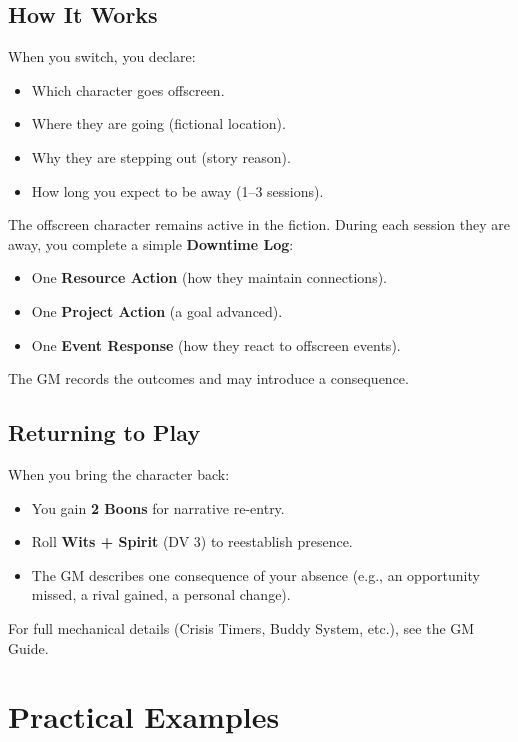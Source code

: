 \subsection{How It Works}
When you switch, you declare:
\begin{itemize}
    \item Which character goes offscreen.
    \item Where they are going (fictional location).
    \item Why they are stepping out (story reason).
    \item How long you expect to be away (1--3 sessions).
\end{itemize}
The offscreen character remains active in the fiction. During each session they are away, you complete a simple \textbf{Downtime Log}:
\begin{itemize}
    \item One \textbf{Resource Action} (how they maintain connections).
    \item One \textbf{Project Action} (a goal advanced).
    \item One \textbf{Event Response} (how they react to offscreen events).
\end{itemize}
The GM records the outcomes and may introduce a consequence.

\subsection{Returning to Play}
When you bring the character back:
\begin{itemize}
    \item You gain \textbf{2 Boons} for narrative re-entry.
    \item Roll \textbf{Wits + Spirit} (DV 3) to reestablish presence.
    \item The GM describes one consequence of your absence (e.g., an opportunity missed, a rival gained, a personal change).
\end{itemize}

For full mechanical details (Crisis Timers, Buddy System, etc.), see the GM Guide.

\section{Practical Examples}
\label{sec:asset-follower-examples}

